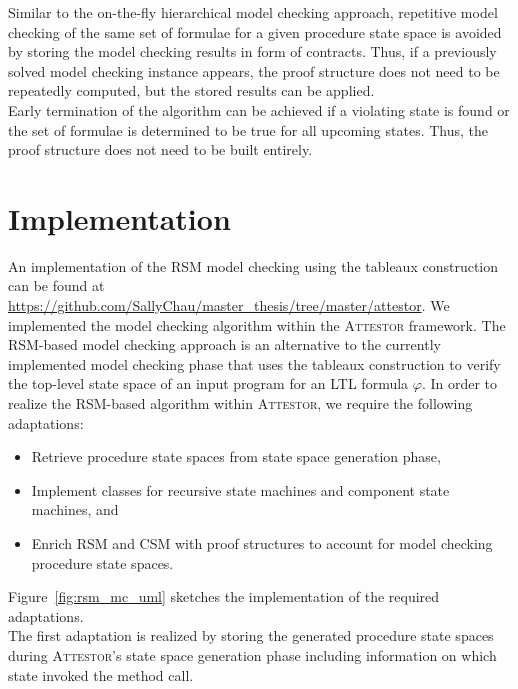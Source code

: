 \documentclass[a4paper, 12pt, twoside]{report}
\begin{document}
	Similar to the on-the-fly hierarchical model checking approach, repetitive model checking of the same set of formulae for a given procedure state space is avoided by storing the model checking results in form of contracts. Thus, if a previously solved model checking instance appears, the proof structure does not need to be repeatedly computed, but the stored results can be applied.\\
	
	Early termination of the algorithm can be achieved if a violating state is found or the set of formulae is determined to be true for all upcoming states. Thus, the proof structure does not need to be built entirely.
	
	\section{Implementation}
	
	An implementation of the RSM model checking using the tableaux construction can be found at \url{https://github.com/SallyChau/master_thesis/tree/master/attestor}. We implemented the model checking algorithm within the \textsc{Attestor} framework. The RSM-based model checking approach is an alternative to the currently implemented model checking phase that uses the tableaux construction to verify the top-level state space of an input program for an LTL formula $\varphi$. In order to realize the RSM-based algorithm within \textsc{Attestor}, we require the following adaptations:
	\begin{itemize}
		\item Retrieve procedure state spaces from state space generation phase,
		\item Implement classes for recursive state machines and component state machines, and
		\item Enrich RSM and CSM with proof structures to account for model checking procedure state spaces.
	\end{itemize}	
	
	Figure~\ref{fig:rsm_mc_uml} sketches the implementation of the required adaptations.\\

	The first adaptation is realized by storing the generated procedure state spaces during \textsc{Attestor}'s state space generation phase including information on which state invoked the method call.\\
	
\end{document}
